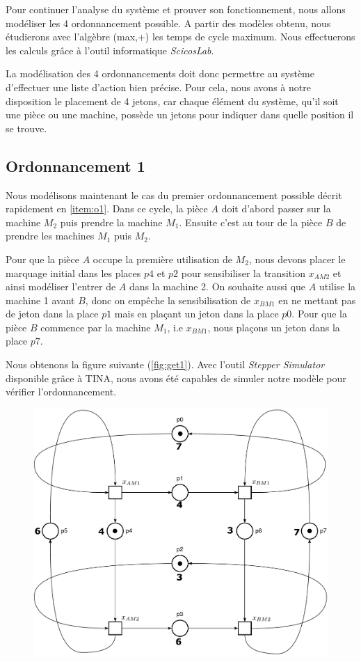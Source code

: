 Pour continuer l'analyse du système et prouver son fonctionnement, nous allons modéliser les 4 ordonnancement possible. A partir des modèles obtenu, nous étudierons avec l'algèbre (max,+) les temps de cycle maximum. Nous effectuerons les calculs grâce à l'outil informatique \emph{ScicosLab}.

La modélisation des 4 ordonnancements doit donc permettre au système d'effectuer une liste d'action bien précise. Pour cela, nous avons à notre disposition le placement de 4 jetons, car chaque élément du système, qu'il soit une pièce ou une machine, possède un jetons pour indiquer dans quelle position il se trouve.
\subsection{Ordonnancement 1}\label{sub:ordo1}
Nous modélisons maintenant le cas du premier ordonnancement possible décrit rapidement en \ref{item:o1}. Dans ce cycle, la pièce $A$ doit d'abord passer sur la machine $M_2$ puis prendre la machine $M_1$. Ensuite c'est au tour de la pièce $B$ de prendre les machines $M_1$ puis $M_2$. 

Pour que la pièce $A$ occupe la première utilisation de $M_2$, nous devons placer le marquage initial dans les places $p4$ et $p2$ pour sensibiliser la transition $x_{AM2}$ et ainsi modéliser l'entrer de $A$ dans la machine 2. On souhaite aussi que $A$ utilise la machine 1 avant $B$, donc on empêche la sensibilisation de $x_{BM1}$ en ne mettant pas de jeton dans la place $p1$ mais en plaçant un jeton dans la place $p0$. Pour que la pièce $B$ commence par la machine $M_1$, i.e $x_{BM1}$, nous plaçons un jeton dans la place $p7$. 

Nous obtenons la figure suivante (\ref{fig:get1}). Avec l'outil \emph{Stepper Simulator} disponible grâce à TINA, nous avons été capables de simuler notre modèle pour vérifier l'ordonnancement.
\begin{figure}
\begin{center}
\includegraphics[width = .75\textwidth]{./II/images/GET_1.pdf}
\end{center}
\end{figure}
 
